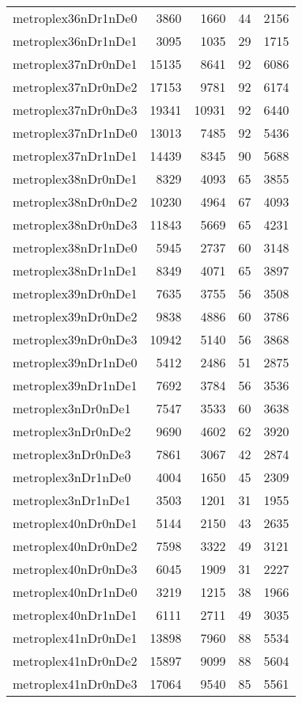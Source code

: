 \documentclass[../../../thesis.tex]{subfiles}
\begin{document}
\begin{longtable}{lrrrr}
metroplex36nDr1nDe0 & 3860 & 1660 & 44 & 2156 \\
metroplex36nDr1nDe1 & 3095 & 1035 & 29 & 1715 \\
metroplex37nDr0nDe1 & 15135 & 8641 & 92 & 6086 \\
metroplex37nDr0nDe2 & 17153 & 9781 & 92 & 6174 \\
metroplex37nDr0nDe3 & 19341 & 10931 & 92 & 6440 \\
metroplex37nDr1nDe0 & 13013 & 7485 & 92 & 5436 \\
metroplex37nDr1nDe1 & 14439 & 8345 & 90 & 5688 \\
metroplex38nDr0nDe1 & 8329 & 4093 & 65 & 3855 \\
metroplex38nDr0nDe2 & 10230 & 4964 & 67 & 4093 \\
metroplex38nDr0nDe3 & 11843 & 5669 & 65 & 4231 \\
metroplex38nDr1nDe0 & 5945 & 2737 & 60 & 3148 \\
metroplex38nDr1nDe1 & 8349 & 4071 & 65 & 3897 \\
metroplex39nDr0nDe1 & 7635 & 3755 & 56 & 3508 \\
metroplex39nDr0nDe2 & 9838 & 4886 & 60 & 3786 \\
metroplex39nDr0nDe3 & 10942 & 5140 & 56 & 3868 \\
metroplex39nDr1nDe0 & 5412 & 2486 & 51 & 2875 \\
metroplex39nDr1nDe1 & 7692 & 3784 & 56 & 3536 \\
metroplex3nDr0nDe1 & 7547 & 3533 & 60 & 3638 \\
metroplex3nDr0nDe2 & 9690 & 4602 & 62 & 3920 \\
metroplex3nDr0nDe3 & 7861 & 3067 & 42 & 2874 \\
metroplex3nDr1nDe0 & 4004 & 1650 & 45 & 2309 \\
metroplex3nDr1nDe1 & 3503 & 1201 & 31 & 1955 \\
metroplex40nDr0nDe1 & 5144 & 2150 & 43 & 2635 \\
metroplex40nDr0nDe2 & 7598 & 3322 & 49 & 3121 \\
metroplex40nDr0nDe3 & 6045 & 1909 & 31 & 2227 \\
metroplex40nDr1nDe0 & 3219 & 1215 & 38 & 1966 \\
metroplex40nDr1nDe1 & 6111 & 2711 & 49 & 3035 \\
metroplex41nDr0nDe1 & 13898 & 7960 & 88 & 5534 \\
metroplex41nDr0nDe2 & 15897 & 9099 & 88 & 5604 \\
metroplex41nDr0nDe3 & 17064 & 9540 & 85 & 5561 \\

\end{longtable}
\end{document}
